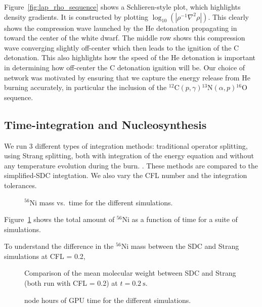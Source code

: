 \documentclass[modern]{aastex631}
\newcommand{\isot}[2]{$^{#2}\mathrm{#1}$}
\newcommand{\isotm}[2]{{}^{#2}\mathrm{#1}}
\newcommand{\MarginPar}[1]{
    \marginpar{\vskip-\baselineskip%
               \raggedright%
               \tiny\sffamily%
               {\color{red}\hrule%
               \smallskip%
               #1\par%
               \smallskip%
               \hrule}}%
}
\begin{document}
Figure~\ref{fig:lap_rho_sequence} shows a Schlieren-style plot, which
highlights density gradients.  It is constructed by plotting
$\log_{10}(|\rho^{-1}\nabla^2\rho|)$.  This clearly shows the
compression wave launched by the He detonation propagating in toward
the center of the white dwarf.  The middle row shows this compression
wave converging slightly off-center which then leads to the ignition
of the C detonation.  This also highlights how the speed of the He
detonation is important in determining how off-center the C detonation
ignition will be.  Our choice of network was motivated by ensuring
that we capture the energy release from He burning accurately, in
particular the inclusion of the
$\isotm{C}{12}(p,\gamma)\isotm{N}{13}(\alpha,p)\isotm{O}{16}$
sequence.


\subsection{Time-integration and Nucleosynthesis}

We run 3 different types of integration methods: traditional operator
splitting, using Strang splitting, both with integration of the energy
equation and without any temperature evolution during the
burn.  \MarginPar{comment about the EOS}.  These methods are compared
to the simplified-SDC integtation.  We also vary the CFL number and
the integration tolerances.

\begin{figure}[t]
\centering
{}
\caption{\label{fig:ni56} \isot{Ni}{56} mass vs.\ time for the different simulations.}
\end{figure}

Figure~\ref{fig:ni56} shows the total amount of \isot{Ni}{56} as a function of time for
a suite of simulations.  

To understand the difference in the \isot{Ni}{56} mass between the SDC and Strang simulations at 
CFL = 0.2, 

\begin{figure}[t]
\centering
{}
\caption{\label{fig:abar_sdc_strang} Comparison of the mean molecular weight between SDC and Strang (both run with CFL = 0.2) at $t = 0.2~\mathrm{s}$.}
\end{figure}



\begin{figure}[t]
\centering
{}
\caption{\label{fig:cpu} node hours of GPU time for the different simulations.}
\end{figure}
\end{document}
